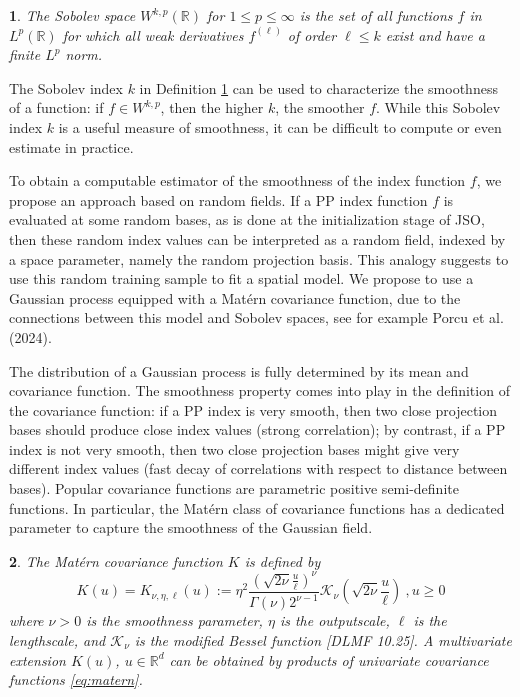 \documentclass[
  12pt,
]{interact}
\theoremstyle{plain}
\newtheorem{defn}{\protect\definitionname}
\providecommand{\definitionname}{Definition}
\begin{document}
\begin{defn}\label{def:sobolev_space}
The Sobolev space $W^{k,p}(\mathbb{R})$ for $1\leq p\leq \infty$ is the set of all functions $f$ in $L^p(\mathbb{R})$ for which all weak derivatives $f^{(\ell)}$ of order $\ell\leq k$ exist and have a finite $L^p$ norm.
\end{defn}

The Sobolev index \(k\) in Definition \ref{def:sobolev_space} can be
used to characterize the smoothness of a function: if \(f\in W^{k,p}\),
then the higher \(k\), the smoother \(f\). While this Sobolev index
\(k\) is a useful measure of smoothness, it can be difficult to compute
or even estimate in practice.

To obtain a computable estimator of the smoothness of the index function
\(f\), we propose an approach based on random fields. If a PP index
function \(f\) is evaluated at some random bases, as is done at the
initialization stage of JSO, then these random index values can be
interpreted as a random field, indexed by a space parameter, namely the
random projection basis. This analogy suggests to use this random
training sample to fit a spatial model. We propose to use a Gaussian
process equipped with a Matérn covariance function, due to the
connections between this model and Sobolev spaces, see for example Porcu
et al. (2024).

The distribution of a Gaussian process is fully determined by its mean
and covariance function. The smoothness property comes into play in the
definition of the covariance function: if a PP index is very smooth,
then two close projection bases should produce close index values
(strong correlation); by contrast, if a PP index is not very smooth,
then two close projection bases might give very different index values
(fast decay of correlations with respect to distance between bases).
Popular covariance functions are parametric positive semi-definite
functions. In particular, the Matérn class of covariance functions has a
dedicated parameter to capture the smoothness of the Gaussian field.

\begin{defn}
The Matérn covariance function $K$ is defined by
\begin{equation}
K(u)=K_{\nu,\eta,\ell}(u):=\eta^2\frac{\left(\sqrt{2\nu}\frac{u}{\ell}\right)^{\nu}}{\Gamma(\nu)2^{\nu-1}}\mathcal{K}_{\nu}\left(\sqrt{2\nu}\frac{u}{\ell}\right)\ , u\geq0\label{eq:matern}
\end{equation}
where $\nu>0$ is the smoothness parameter, $\eta$ is the outputscale, $\ell$ is the lengthscale, and $\mathcal{K}_\nu$ is
the modified Bessel function [DLMF 10.25]. A multivariate extension $K(u)$, $u\in\mathbb{R}^d$ can be obtained by products of univariate covariance functions \eqref{eq:matern}.
\end{defn}
\end{document}
